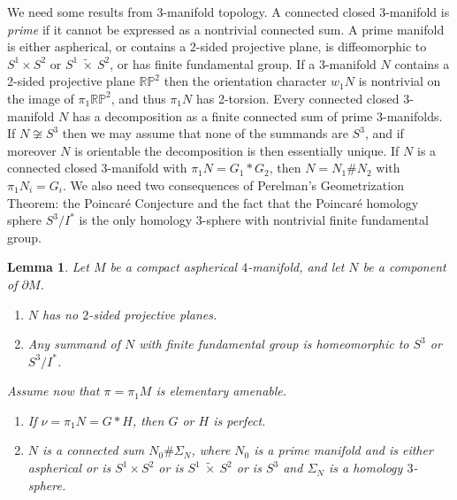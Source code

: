 \documentclass[12pt]{amsart}
\newtheorem{lemma}[theorem]{Lemma}
\theoremstyle{definition}
\begin{document}
We need some results from 3-manifold topology.  
A connected closed 3-manifold is {\em prime} if it cannot be expressed as a nontrivial connected sum.   
A prime manifold is either aspherical, or contains a 2-sided projective plane, 
is diffeomorphic to $S^1 \times S^2$ or $S^1 ~\tilde \times~ S^2$, 
or has finite fundamental group. 
If a 3-manifold $N$ contains a 2-sided projective plane $\mathbb{RP}^2$ then the orientation character
$w_1N$ is nontrivial on the image of $\pi_1\mathbb{RP}^2$, and thus $\pi_1N  $ has 2-torsion.
Every connected closed 3-manifold $N$ has a decomposition as a finite connected sum 
of prime 3-manifolds.
If $N\not\cong{S^3}$ then we may assume that none of the summands are $S^3$,
and if moreover $N$ is orientable the decomposition is then essentially unique.
If $N$ is a connected closed 3-manifold with $\pi_1N = G_1 * G_2$, 
then $N = N_1 \# N_2$ with $\pi_1N_i = G_i$.    
We also need two consequences of Perelman's Geometrization Theorem: 
the Poincar\'e Conjecture and  the fact that the Poincar\'e homology sphere $S^3/I^*$ 
is the only homology 3-sphere with nontrivial finite fundamental group.

\begin{lemma}
\label{ZHS summand}
Let $M$ be a compact aspherical $4$-manifold, and let $N$ be a component of $\partial{M}$.
\begin{enumerate}
\item $N$ has no $2$-sided projective planes.
\item Any summand of $N$ with finite fundamental group is homeomorphic to $S^3$ or $S^3/I^*$.
\end{enumerate}
Assume now that  $\pi=\pi_1M$ is elementary amenable.
 \begin{enumerate}
\addtocounter{enumi}{2}
\item 
If $\nu=\pi_1N = G * H$, then $G$ or $H$ is perfect.
\item $N$ is a connected sum $N_0\#\Sigma_N$, 
where $N_0$ is a prime manifold and is either aspherical or is $S^1 \times S^2$ 
or is $S^1~ \tilde \times ~S^2$ or is $S^3$
and $\Sigma_N$ is a homology $3$-sphere.
\end{enumerate}
\end{lemma}
\end{document}
